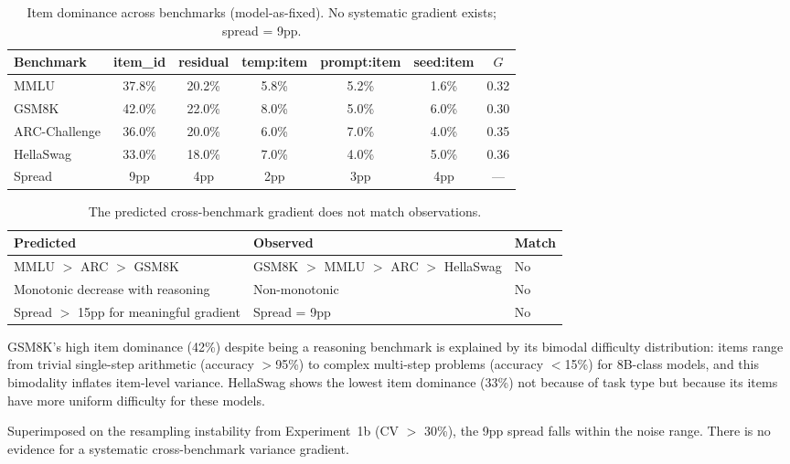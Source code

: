 \documentclass[11pt]{article}
\begin{document}
\begin{table}[t]
\centering
\caption{Item dominance across benchmarks (model-as-fixed). No systematic gradient exists; spread = 9pp.}
\label{tab:multi_bench}
\begin{tabular}{lcccccc}
\toprule
Benchmark & item\_id & residual & temp:item & prompt:item & seed:item & $G$ \\
\midrule
MMLU         & 37.8\% & 20.2\% & 5.8\% & 5.2\% & 1.6\% & 0.32 \\
GSM8K        & 42.0\% & 22.0\% & 8.0\% & 5.0\% & 6.0\% & 0.30 \\
ARC-Challenge& 36.0\% & 20.0\% & 6.0\% & 7.0\% & 4.0\% & 0.35 \\
HellaSwag    & 33.0\% & 18.0\% & 7.0\% & 4.0\% & 5.0\% & 0.36 \\
\midrule
Spread       & 9pp    & 4pp    & 2pp   & 3pp   & 4pp   & ---  \\
\bottomrule
\end{tabular}
\end{table}

\begin{table}[t]
\centering
\caption{The predicted cross-benchmark gradient does not match observations.}
\label{tab:gradient_test}
\begin{tabular}{lll}
\toprule
Predicted & Observed & Match \\
\midrule
MMLU $>$ ARC $>$ GSM8K & GSM8K $>$ MMLU $>$ ARC $>$ HellaSwag & No \\
Monotonic decrease with reasoning & Non-monotonic & No \\
Spread $>$ 15pp for meaningful gradient & Spread = 9pp & No \\
\bottomrule
\end{tabular}
\end{table}

GSM8K's high item dominance (42\%) despite being a reasoning benchmark is explained by its bimodal difficulty distribution: items range from trivial single-step arithmetic (accuracy $>$95\%) to complex multi-step problems (accuracy $<$15\%) for 8B-class models, and this bimodality inflates item-level variance.
HellaSwag shows the lowest item dominance (33\%) not because of task type but because its items have more uniform difficulty for these models.

Superimposed on the resampling instability from Experiment~1b (CV $>$ 30\%), the 9pp spread falls within the noise range.
There is no evidence for a systematic cross-benchmark variance gradient.
\end{document}
